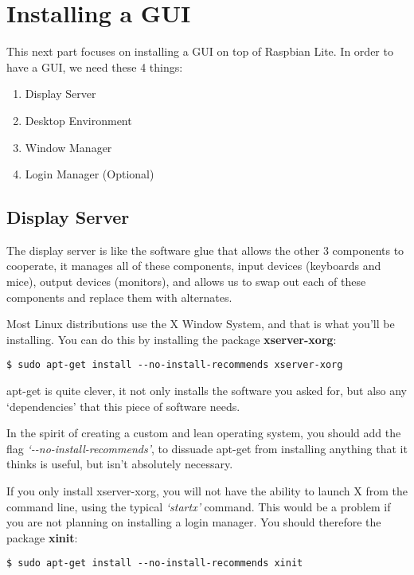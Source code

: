 \section{Installing a GUI}

	This next part focuses on installing a GUI on top of Raspbian Lite. In order to have a GUI, we need these 4 things:
	
	\begin{enumerate}[nosep]
		\item Display Server
		\item Desktop Environment
		\item Window Manager
		\item Login Manager (Optional)
	\end{enumerate}
		
	\subsection{Display Server}
	
		The display server is like the software glue that allows the other 3 components to cooperate, it manages all of these components, input devices (keyboards and mice), output devices (monitors), and allows us to swap out each of these components and replace them with alternates.
		
		Most Linux distributions use the X Window System, and that is what you'll be installing. You can do this by installing the package \textbf{xserver-xorg}:
	
\begin{lstlisting}[style=Terminal, breaklines=true]
$ sudo apt-get install --no-install-recommends xserver-xorg
\end{lstlisting}

		apt-get is quite clever, it not only installs the software you asked for, but also any `dependencies' that this piece of software needs.
		
		In the spirit of creating a custom and lean operating system, you should add the flag \textit{\mbox{`-\--no-install-recommends'}}, to dissuade apt-get from installing anything that it thinks is useful, but isn't absolutely necessary.
		
		If you only install xserver-xorg, you will not have the ability to launch X from the command line, using the typical \textit{`startx'} command. This would be a problem if you are not planning on installing a login manager. You should therefore the package \textbf{xinit}:
	
\begin{lstlisting}[style=Terminal, breaklines=true]
$ sudo apt-get install --no-install-recommends xinit
\end{lstlisting}

